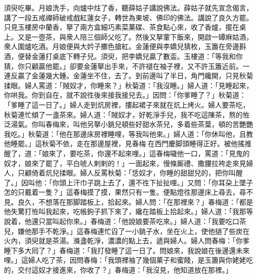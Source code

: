 須臾吃畢。月娘洗手，向爐中炷了香，聽薛姑子講說佛法。薛姑子就先宣念偈言，講了一段五戒禪師破戒戲紅蓮女子，轉世為東坡、佛印的佛法。講說了良久方罷。只見玉樓房中蘭香，拏了兩方盒細巧素菜菓碟、茶食點心來，收了香爐，擺在桌上。又是一壺茶，與衆人陪三個師父吃了。然後又拏葷下飯來，開啟一罈麻姑酒，衆人圍爐吃酒。月娘便與大妗子擲色搶紅。金蓮便與李嬌兒猜枚，玉簫在旁邊斟酒，便替金蓮打桌底下轉子兒。須臾，把李嬌兒贏了數盃。{}玉樓道：「等我和你猜，你只顧贏他罷。」卻要金蓮拏出手來，不許褪在袖子裡，又不許玉簫近前。{}一連反贏了金蓮幾大鍾。金蓮坐不住，去了。到前邊叫了半日，角門纔開，只見秋菊揉眼。婦人罵道：「賊奴才，你睡來？」秋菊道：「我沒睡。」{}婦人道：「見睡起來，你哄我。你到自在，就不說徃後來接我接兒去。」因問：「你爹睡了？」秋菊道：「爹睡了這一日了。」婦人走到炕房裡，摟起裙子來就在炕上烤火。婦人要茶吃，秋菊連忙傾了一盞茶來。婦人道：「賊奴才，好乾淨手兒，我不吃這陳茶，熬的恠泛湯氣。你叫春梅來，叫他另拏小銚兒頓些好甜水茶兒，多着些茶葉，頓的苦艷艷我吃。」秋菊道：「他在那邊床房裡睡哩，等我叫他來。」婦人道：「你休叫他，且教他睡罷。」{}這秋菊不依，走在那邊屋裡，見春梅𢱉在西門慶脚頭睡得正好。{}被他搖推醒了，道：「娘來了，要吃茶，你還不起來哩。」這春梅噦他一口，罵道：「見鬼的奴才，娘來了罷了，平白唬人剌剌的！」一面起來，慢條厮禮、撒腰拉袴走來見婦人，只顧倚着炕兒揉眼。婦人反罵秋菊：「恁奴才，你睡的甜甜兒的，把你叫醒了。」因叫他：「你頭上汗巾子跳上去了，還不徃下扯扯哩。」又問：「你耳朶上墜子怎的只戴着一隻？」這春梅摸了摸，果然只有一隻。便點燈徃那邊床上尋去，尋不見。良久，不想落在那脚踏板上，拾起來。婦人問：「在那裡來？」春梅道：「都是他失驚打恠叫我起來，吃帳鉤子抓下來了，纔在踏板上拾起來。」{}婦人道：「我那等說着，他還只當叫起你來。」春梅道：「他說娘要茶吃來。」婦人道：「我要吃口茶兒，嫌他那手不乾淨。」這春梅連忙舀了一小銚子水，坐在火上，使他撾了些炭在火內，須臾就是茶湯。滌盞乾淨，濃濃的點上去，遞與婦人。婦人問春梅：「你爹睡下多大囘了？」春梅道：「我打發睡了這一日了。問娘來，我說娘在後邊還未來哩。」這婦人吃了茶，因問春梅：「我頭裡袖了幾個菓子和蜜餞，是玉簫與你姥姥吃的，交付這奴才接進來，你收了？」春梅道：「我沒見，他知道放在那裡。」

